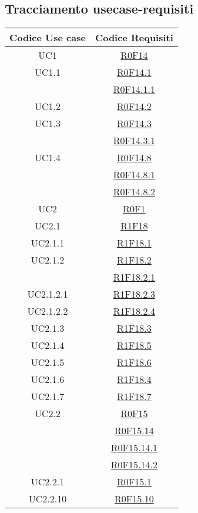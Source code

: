 \documentclass[../AnalisiDeiRequisiti.tex]{subfiles}
\begin{document}
\subsection{Tracciamento usecase-requisiti}
\normalsize
\begin{longtable}{|c|c|}
	\hline
	\textbf{Codice Use case} & \textbf{Codice Requisiti} \\
	\hline
	\endhead
	UC1 & \hyperlink{R0F14}{R0F14}\\\hline
	UC1.1 & \hyperlink{R0F14.1}{R0F14.1}\\& \hyperlink{R0F14.1.1}{R0F14.1.1}\\\hline
	UC1.2 & \hyperlink{R0F14.2}{R0F14.2}\\\hline
	UC1.3 & \hyperlink{R0F14.3}{R0F14.3}\\& \hyperlink{R0F14.3.1}{R0F14.3.1}\\\hline
	UC1.4 & \hyperlink{R0F14.8}{R0F14.8}\\& \hyperlink{R0F14.8.1}{R0F14.8.1}\\& \hyperlink{R0F14.8.2}{R0F14.8.2}\\\hline
	UC2 & \hyperlink{R0F1}{R0F1}\\\hline
	UC2.1 & \hyperlink{R1F18}{R1F18}\\\hline
	UC2.1.1 & \hyperlink{R1F18.1}{R1F18.1}\\\hline
	UC2.1.2 & \hyperlink{R1F18.2}{R1F18.2}\\& \hyperlink{R1F18.2.1}{R1F18.2.1}\\\hline
	UC2.1.2.1 & \hyperlink{R1F18.2.3}{R1F18.2.3}\\\hline
	UC2.1.2.2 & \hyperlink{R1F18.2.4}{R1F18.2.4}\\\hline
	UC2.1.3 & \hyperlink{R1F18.3}{R1F18.3}\\\hline
	UC2.1.4 & \hyperlink{R1F18.5}{R1F18.5}\\\hline
	UC2.1.5 & \hyperlink{R1F18.6}{R1F18.6}\\\hline
	UC2.1.6 & \hyperlink{R1F18.4}{R1F18.4}\\\hline
	UC2.1.7 & \hyperlink{R1F18.7}{R1F18.7}\\\hline
	UC2.2 & \hyperlink{R0F15}{R0F15}\\& \hyperlink{R0F15.14}{R0F15.14}\\& \hyperlink{R0F15.14.1}{R0F15.14.1}\\& \hyperlink{R0F15.14.2}{R0F15.14.2}\\\hline
	UC2.2.1 & \hyperlink{R0F15.1}{R0F15.1}\\\hline
	UC2.2.10 & \hyperlink{R0F15.10}{R0F15.10}\\\hline

\end{longtable}
\end{document}
